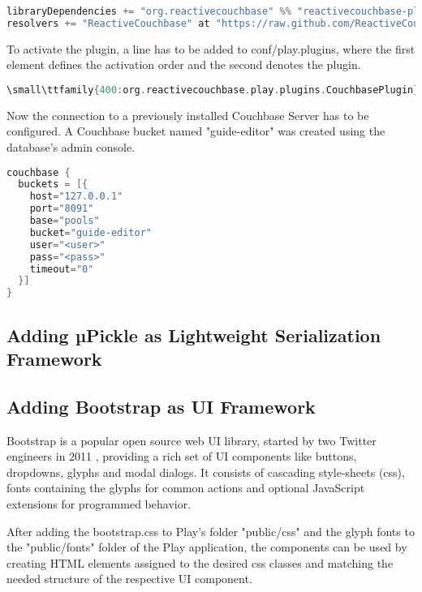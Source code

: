\begin{lstlisting}[caption={Adding ReactiveCouchbase to Play via build.sbt},basicstyle=\tiny\ttfamily,language=c,aboveskip=15pt]
libraryDependencies += "org.reactivecouchbase" %% "reactivecouchbase-play" % "0.3"
resolvers += "ReactiveCouchbase" at "https://raw.github.com/ReactiveCouchbase/repository/master/releases"
\end{lstlisting}

To activate the plugin, a line has to be added to conf/play.plugins, where the first element defines the activation order and the second denotes the plugin.

\begin{lstlisting}[caption={Activating the plugins via play.plugins},basicstyle=\tiny\ttfamily,language=c,aboveskip=15pt]
\small\ttfamily{400:org.reactivecouchbase.play.plugins.CouchbasePlugin}
\end{lstlisting}

Now the connection to a previously installed Couchbase Server has to be configured. A Couchbase bucket named "guide-editor" was created using the database's admin console.

\begin{lstlisting}[caption={Attaching the driver to the local Couchbase Server},basicstyle=\tiny\ttfamily,language=c,aboveskip=15pt]
couchbase {
  buckets = [{
    host="127.0.0.1"
    port="8091"
    base="pools"
    bucket="guide-editor"
    user="<user>"
    pass="<pass>"
    timeout="0"
  }]
}
\end{lstlisting}

\subsection{Adding µPickle as Lightweight Serialization Framework}



\subsection{Adding Bootstrap as UI Framework}

Bootstrap is a popular open source web UI library, started by two Twitter engineers in 2011 \cite{bootstrap}, providing a rich set of UI components like buttons, dropdowns, glyphs and modal dialogs. It consists of cascading style-sheets (css), fonts containing the glyphs for common actions and optional JavaScript extensions for programmed behavior.

After adding the bootstrap.css to Play's folder "public/css" and the glyph fonts to the "public/fonts" folder of the Play application, the components can be used by creating HTML elements assigned to the desired css classes and matching the needed structure of the respective UI component.

